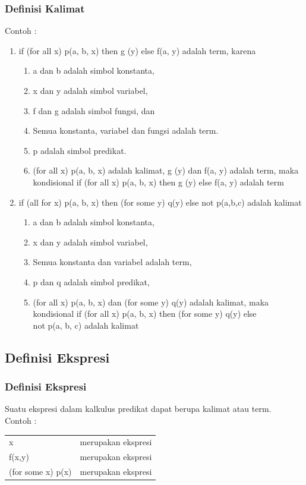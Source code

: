 \documentclass[handout]{beamer}
\theoremstyle{definition}
\theoremstyle{example}
\begin{document}
\begin{frame}
	\frametitle{Definisi Kalimat}
	Contoh :\\
	\begin{enumerate} 
		\item  if (for all x) p(a, b, x) then g (y) else f(a, y) adalah term, karena
			\begin{enumerate} 
				\item  a dan b adalah simbol konstanta,
				\item  x dan y adalah simbol variabel,
				\item  f dan g adalah simbol fungsi, dan
				\item  Semua konstanta, variabel dan fungsi adalah term.
				\item  p adalah simbol predikat.
				\item  (for all x) p(a, b, x) adalah kalimat, g (y) dan f(a, y) adalah term, maka kondisional if (for all x) p(a, b, x) then g (y) else f(a, y) adalah term
		     \end{enumerate}
		     
		\item  if (all for x) p(a, b, x) then (for some y) q(y) else not p(a,b,c) adalah kalimat
		 \begin{enumerate} 
		 	\item  a dan b adalah simbol konstanta,
		 	\item  x dan y adalah simbol variabel,
		 	\item  Semua konstanta dan variabel adalah term,
		 	\item  p dan q adalah simbol predikat,
		 	\item  (for all x) p(a, b, x) dan (for some y) q(y) adalah kalimat, 
		 	maka \\kondisional if (for all x) p(a, b, x) then (for some y) q(y) else \\not p(a, b, c) adalah kalimat 
		 \end{enumerate}    
    \end{enumerate}
	
\end{frame}	

\subsection{Definisi Ekspresi}
\begin{frame}
	\frametitle{Definisi Ekspresi}
     Suatu ekspresi dalam kalkulus predikat dapat berupa kalimat atau term.\\
     Contoh :\\
	  \begin{tabular}{ l l }	
		x        &         merupakan ekspresi\\
		f(x,y)   &         merupakan ekspresi\\
		(for some x) p(x) & merupakan ekspresi
	 \end{tabular}	
\end{frame}
\end{document}
